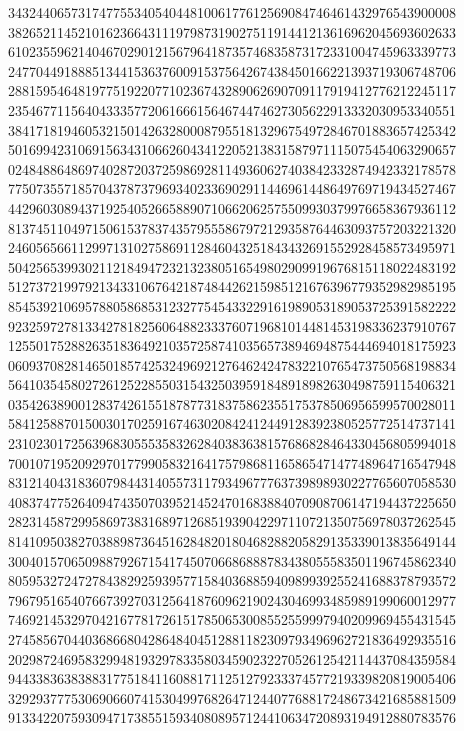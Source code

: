 {{    3432440657317477553405404481006177612569084746461432976543900008 ~
    3826521145210162366431119798731902751191441213616962045693602633 ~
    6102355962140467029012156796418735746835873172331004745963339773 ~
    2477044918885134415363760091537564267438450166221393719306748706 ~
    2881595464819775192207710236743289062690709117919412776212245117 ~
    2354677115640433357720616661564674474627305622913332030953340551 ~
    3841718194605321501426328000879551813296754972846701883657425342 ~
    5016994231069156343106626043412205213831587971115075454063290657 ~
    0248488648697402872037259869281149360627403842332874942332178578 ~
    7750735571857043787379693402336902911446961448649769719434527467 ~
    4429603089437192540526658890710662062575509930379976658367936112 ~
    8137451104971506153783743579555867972129358764463093757203221320 ~
    2460565661129971310275869112846043251843432691552928458573495971 ~
    5042565399302112184947232132380516549802909919676815118022483192 ~
    5127372199792134331067642187484426215985121676396779352982985195 ~
    8545392106957880586853123277545433229161989053189053725391582222 ~
    9232597278133427818256064882333760719681014481453198336237910767 ~
    1255017528826351836492103572587410356573894694875444694018175923 ~
    0609370828146501857425324969212764624247832210765473750568198834 ~
    5641035458027261252285503154325039591848918982630498759115406321 ~
    0354263890012837426155187877318375862355175378506956599570028011 ~
    5841258870150030170259167463020842412449128392380525772514737141 ~
    2310230172563968305553583262840383638157686828464330456805994018 ~
    7001071952092970177990583216417579868116586547147748964716547948 ~
    8312140431836079844314055731179349677763739898930227765607058530 ~
    4083747752640947435070395214524701683884070908706147194437225650 ~
    2823145872995869738316897126851939042297110721350756978037262545 ~
    8141095038270388987364516284820180468288205829135339013835649144 ~
    3004015706509887926715417450706686888783438055583501196745862340 ~
    8059532724727843829259395771584036885940989939255241688378793572 ~
    7967951654076673927031256418760962190243046993485989199060012977 ~
    7469214532970421677817261517850653008552559997940209969455431545 ~
    2745856704403686680428648404512881182309793496962721836492935516 ~
    2029872469583299481932978335803459023227052612542114437084359584 ~
    9443383638388317751841160881711251279233374577219339820819005406 ~
    3292937775306906607415304997682647124407768817248673421685881509 ~
    9133422075930947173855159340808957124410634720893194912880783576 ~
}}
